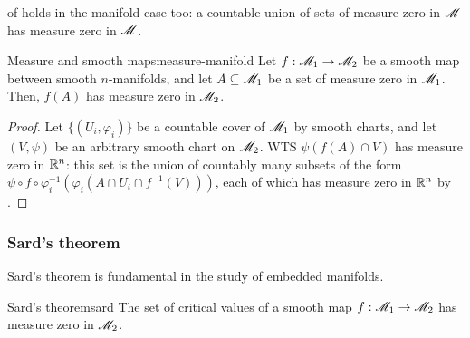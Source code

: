  of  holds in the manifold case too: a countable union of sets of measure zero in $ \mathscr{M} $ has measure zero in $ \mathscr{M} $.

\begin{proposition}{Measure and smooth maps}{measure-manifold}
  Let $ f : \mathscr{M}_1 \rightarrow \mathscr{M}_2 $ be a smooth map between smooth $ n $-manifolds, and let $ A \subseteq \mathscr{M}_1 $ be a set of measure zero in $ \mathscr{M}_1 $. Then, $ f(A) $ has measure zero in $ \mathscr{M}_2 $.
\end{proposition}

\begin{proofbox}
  \begin{proof}
    Let $ \{(U_i , \varphi_i)\} $ be a countable cover of $ \mathscr{M}_1 $ by smooth charts, and let $ (V,\psi) $ be an arbitrary smooth chart on $ \mathscr{M}_2 $. WTS $ \psi(f(A) \cap V) $ has measure zero in $ \mathbb{R}^n $: this set is the union of countably many subsets of the form $ \psi \circ f \circ \varphi_i^{-1}(\varphi_i(A \cap U_i \cap f^{-1}(V))) $, each of which has measure zero in $ \mathbb{R}^n $ by .
  \end{proof}
\end{proofbox}

\subsubsection{Sard's theorem}

Sard's theorem is fundamental in the study of embedded manifolds.

\begin{theorem}{Sard's theorem}{sard}
  The set of critical values of a smooth map $ f : \mathscr{M}_1 \rightarrow \mathscr{M}_2 $ has measure zero in $ \mathscr{M}_2 $.
\end{theorem}

